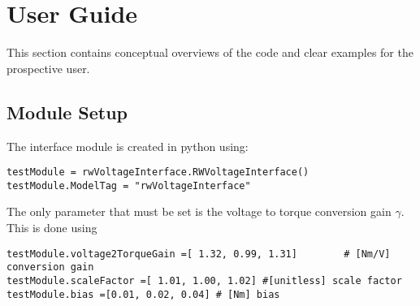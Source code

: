 \section{User Guide}
This section contains conceptual overviews of the code and clear examples for the prospective user. 

\subsection{Module Setup}
The interface module is created in python using:
\begin{verbatim}
testModule = rwVoltageInterface.RWVoltageInterface()
testModule.ModelTag = "rwVoltageInterface"
\end{verbatim}
The only parameter that must be set is the voltage to torque conversion gain $\gamma$.  This is done using
\begin{verbatim}
testModule.voltage2TorqueGain =[ 1.32, 0.99, 1.31]        # [Nm/V] conversion gain 
testModule.scaleFactor =[ 1.01, 1.00, 1.02] #[unitless] scale factor
testModule.bias =[0.01, 0.02, 0.04]	# [Nm] bias
\end{verbatim}